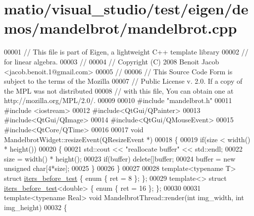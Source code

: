 \hypertarget{matio_2visual__studio_2test_2eigen_2demos_2mandelbrot_2mandelbrot_8cpp_source}{}\section{matio/visual\+\_\+studio/test/eigen/demos/mandelbrot/mandelbrot.cpp}
\label{matio_2visual__studio_2test_2eigen_2demos_2mandelbrot_2mandelbrot_8cpp_source}

\begin{DoxyCode}
00001 \textcolor{comment}{// This file is part of Eigen, a lightweight C++ template library}
00002 \textcolor{comment}{// for linear algebra.}
00003 \textcolor{comment}{//}
00004 \textcolor{comment}{// Copyright (C) 2008 Benoit Jacob <jacob.benoit.1@gmail.com>}
00005 \textcolor{comment}{//}
00006 \textcolor{comment}{// This Source Code Form is subject to the terms of the Mozilla}
00007 \textcolor{comment}{// Public License v. 2.0. If a copy of the MPL was not distributed}
00008 \textcolor{comment}{// with this file, You can obtain one at http://mozilla.org/MPL/2.0/.}
00009 
00010 \textcolor{preprocessor}{#include "mandelbrot.h"}
00011 \textcolor{preprocessor}{#include <iostream>}
00012 \textcolor{preprocessor}{#include<QtGui/QPainter>}
00013 \textcolor{preprocessor}{#include<QtGui/QImage>}
00014 \textcolor{preprocessor}{#include<QtGui/QMouseEvent>}
00015 \textcolor{preprocessor}{#include<QtCore/QTime>}
00016 
00017 \textcolor{keywordtype}{void} MandelbrotWidget::resizeEvent(QResizeEvent *)
00018 \{
00019   \textcolor{keywordflow}{if}(size < width() * height())
00020   \{
00021     std::cout << \textcolor{stringliteral}{"reallocate buffer"} << std::endl;
00022     size = width() * height();
00023     \textcolor{keywordflow}{if}(buffer) \textcolor{keyword}{delete}[]buffer;
00024     buffer = \textcolor{keyword}{new} \textcolor{keywordtype}{unsigned} \textcolor{keywordtype}{char}[4*size];
00025   \}
00026 \}
00027 
00028 \textcolor{keyword}{template}<\textcolor{keyword}{typename} T> \textcolor{keyword}{struct }\hyperlink{structiters__before__test}{iters\_before\_test} \{ \textcolor{keyword}{enum} \{ ret = 8 \}; \};
00029 \textcolor{keyword}{template}<> \textcolor{keyword}{struct }\hyperlink{structiters__before__test}{iters\_before\_test}<double> \{ \textcolor{keyword}{enum} \{ ret = 16 \}; \};
00030 
00031 \textcolor{keyword}{template}<\textcolor{keyword}{typename} Real> \textcolor{keywordtype}{void} MandelbrotThread::render(\textcolor{keywordtype}{int} img\_width, \textcolor{keywordtype}{int} img\_height)
00032 \{

\end{DoxyCode}
